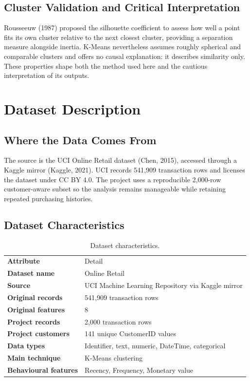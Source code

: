 \documentclass[11pt,a4paper]{article}
\begin{document}
\subsection{Cluster Validation and Critical Interpretation}
Rousseeuw (1987) proposed the silhouette coefficient to assess how well a point fits its own cluster relative to the next closest cluster, providing a separation measure alongside inertia. K-Means nevertheless assumes roughly spherical and comparable clusters and offers no causal explanation: it describes similarity only. These properties shape both the method used here and the cautious interpretation of its outputs.
\clearpage

\section{Dataset Description}
\subsection{Where the Data Comes From}
The source is the UCI Online Retail dataset (Chen, 2015), accessed through a Kaggle mirror (Kaggle, 2021). UCI records 541,909 transaction rows and licenses the dataset under CC BY 4.0. The project uses a reproducible 2,000-row customer-aware subset so the analysis remains manageable while retaining repeated purchasing histories.

\subsection{Dataset Characteristics}
\begin{table}[H]
\centering
\caption{Dataset characteristics.}\label{tab:characteristics}
\begin{tabularx}{0.92\textwidth}{>{\bfseries}p{} X}
\rowcolor{bcuBlue}\color{white}Attribute & \color{white}Detail\\
Dataset name & Online Retail\\
Source & UCI Machine Learning Repository via Kaggle mirror\\
Original records & 541,909 transaction rows\\
Original features & 8\\
Project records & 2,000 transaction rows\\
Project customers & 141 unique CustomerID values\\
Data types & Identifier, text, numeric, DateTime, categorical\\
Main technique & K-Means clustering\\
Behavioural features & Recency, Frequency, Monetary value\\
\end{tabularx}
\end{table}
\end{document}
